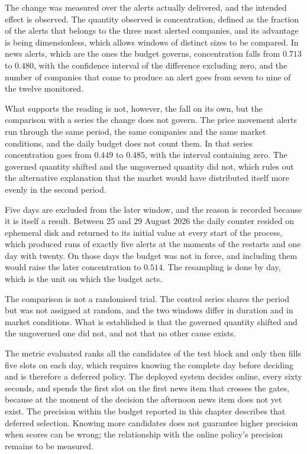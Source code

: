 The change was measured over the alerts actually delivered, and the intended effect is observed.
The quantity observed is concentration, defined as the fraction of the alerts that belongs to the
three most alerted companies, and its advantage is being dimensionless, which allows windows of
distinct sizes to be compared. In news alerts, which are the ones the budget governs, concentration
falls from $0.713$ to $0.480$, with the confidence interval of the difference excluding zero, and
the number of companies that come to produce an alert goes from seven to nine of the twelve
monitored.

What supports the reading is not, however, the fall on its own, but the comparison with a series
the change does not govern. The price movement alerts run through the same period, the same
companies and the same market conditions, and the daily budget does not count them. In that series
concentration goes from $0.449$ to $0.485$, with the interval containing zero. The governed
quantity shifted and the ungoverned quantity did not, which rules out the alternative explanation
that the market would have distributed itself more evenly in the second period.

Five days are excluded from the later window, and the reason is recorded because it is itself a
result. Between 25 and 29 August 2026 the daily counter resided on ephemeral disk and returned to
its initial value at every start of the process, which produced runs of exactly five alerts at the
moments of the restarts and one day with twenty. On those days the budget was not in force, and
including them would raise the later concentration to $0.514$. The resampling is done by day, which
is the unit on which the budget acts.

The comparison is not a randomised trial. The control series shares the period but was not
assigned at random, and the two windows differ in duration and in market conditions. What is
established is that the governed quantity shifted and the ungoverned one did not, and not that no
other cause exists.

The metric evaluated ranks all the candidates of the test block and only then fills five slots on
each day, which requires knowing the complete day before deciding and is therefore a deferred
policy. The deployed system decides online, every sixty seconds, and spends the first slot on the
first news item that crosses the gates, because at the moment of the decision the afternoon news
item does not yet exist. The precision within the budget reported in this chapter describes that
deferred selection. Knowing more candidates does not guarantee higher precision when scores can
be wrong; the relationship with the online policy's precision remains to be measured.

